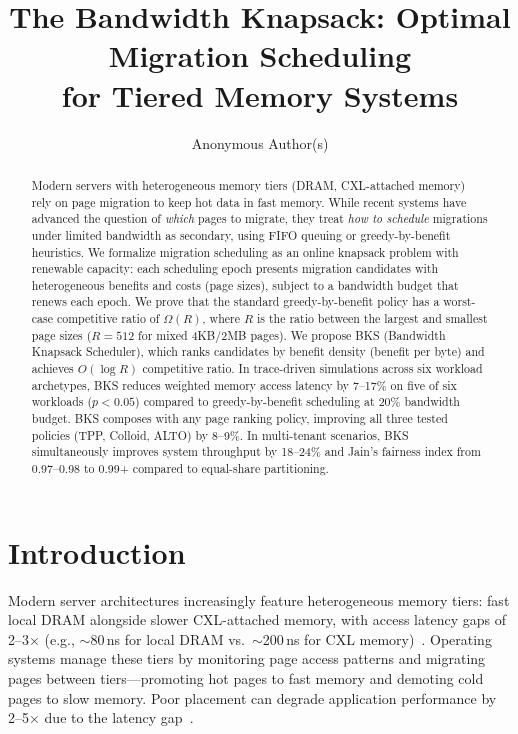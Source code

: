\documentclass{article}
\title{The Bandwidth Knapsack: Optimal Migration Scheduling\\for Tiered Memory Systems}
\author{
  Anonymous Author(s)
}
\begin{document}
\maketitle

\begin{abstract}
Modern servers with heterogeneous memory tiers (DRAM, CXL-attached memory) rely on page migration to keep hot data in fast memory. While recent systems have advanced the question of \emph{which} pages to migrate, they treat \emph{how to schedule} migrations under limited bandwidth as secondary, using FIFO queuing or greedy-by-benefit heuristics. We formalize migration scheduling as an online knapsack problem with renewable capacity: each scheduling epoch presents migration candidates with heterogeneous benefits and costs (page sizes), subject to a bandwidth budget that renews each epoch. We prove that the standard greedy-by-benefit policy has a worst-case competitive ratio of $\Omega(R)$, where $R$ is the ratio between the largest and smallest page sizes ($R=512$ for mixed 4KB/2MB pages). We propose BKS (Bandwidth Knapsack Scheduler), which ranks candidates by benefit density (benefit per byte) and achieves $O(\log R)$ competitive ratio. In trace-driven simulations across six workload archetypes, BKS reduces weighted memory access latency by 7--17\% on five of six workloads ($p < 0.05$) compared to greedy-by-benefit scheduling at 20\% bandwidth budget. BKS composes with any page ranking policy, improving all three tested policies (TPP, Colloid, ALTO) by 8--9\%. In multi-tenant scenarios, BKS simultaneously improves system throughput by 18--24\% and Jain's fairness index from 0.97--0.98 to 0.99+ compared to equal-share partitioning.
\end{abstract}

\section{Introduction}

Modern server architectures increasingly feature heterogeneous memory tiers: fast local DRAM alongside slower CXL-attached memory, with access latency gaps of 2--3$\times$ (e.g., $\sim$80\,ns for local DRAM vs.\ $\sim$200\,ns for CXL memory)~\citep{tpp2023, colloid2024}. Operating systems manage these tiers by monitoring page access patterns and migrating pages between tiers---promoting hot pages to fast memory and demoting cold pages to slow memory. Poor placement can degrade application performance by 2--5$\times$ due to the latency gap~\citep{alto2025}.
\end{document}
